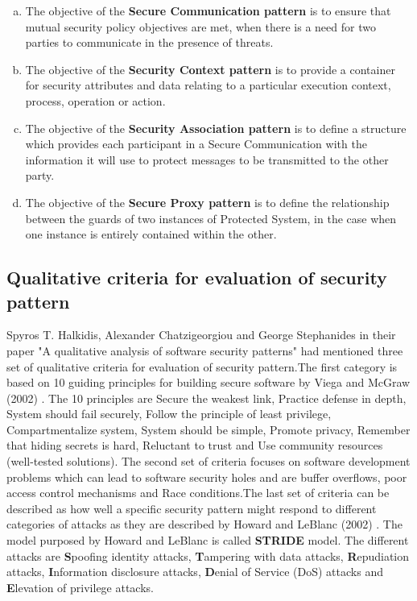 \documentclass[pdftex,english,oribibl]{llncs}
\begin{document}
\begin{enumerate}[(a)]
	\item{The objective of the \textbf{Secure Communication pattern} is to ensure that mutual security policy objectives are met, when there is a need for two parties to communicate in the presence of threats.}
	\item{The objective of the \textbf{Security Context pattern} is to provide a container for security attributes and data relating to a particular execution context, process, operation or action.}
	\item{The objective of the \textbf{Security Association pattern} is to define a structure which provides each participant in a Secure Communication with the information it will use to protect messages to be transmitted to the other party.}
	\item{The objective of the \textbf{Secure Proxy pattern} is to define the relationship between the guards of two instances of Protected System, in the case when one instance is entirely contained within the other.}
\end{enumerate}

\subsection{Qualitative criteria for evaluation of security pattern}
Spyros T. Halkidis, Alexander Chatzigeorgiou and George Stephanides in their paper "A qualitative analysis of software security patterns" \cite{HALKIDIS2006379} had mentioned three set of qualitative criteria for evaluation of security pattern.The first category is based on 10 guiding principles for building secure software by Viega and McGraw (2002) \cite{GaryMcGraw2002}. The 10 principles are Secure the weakest link, Practice defense in depth, System should fail securely, Follow the principle of least privilege, Compartmentalize system, System should be simple, Promote privacy,	Remember that hiding secrets is hard, Reluctant to trust and Use community resources (well-tested solutions). The second set of criteria focuses on software development problems which can lead to software security holes and are buffer overflows, poor access control mechanisms and Race conditions.The last set of criteria can be described as how well a specific security pattern might respond to different categories of attacks as they are described by Howard and LeBlanc (2002) \cite{Howard:2002:WSC:579079}. The model purposed by Howard and LeBlanc is called \textbf{STRIDE} model. The different attacks are \textbf{S}poofing identity attacks, \textbf{T}ampering with data attacks, \textbf{R}epudiation attacks, \textbf{I}nformation disclosure attacks, \textbf{D}enial of Service (DoS) attacks and \textbf{E}levation of privilege attacks.
\end{document}
